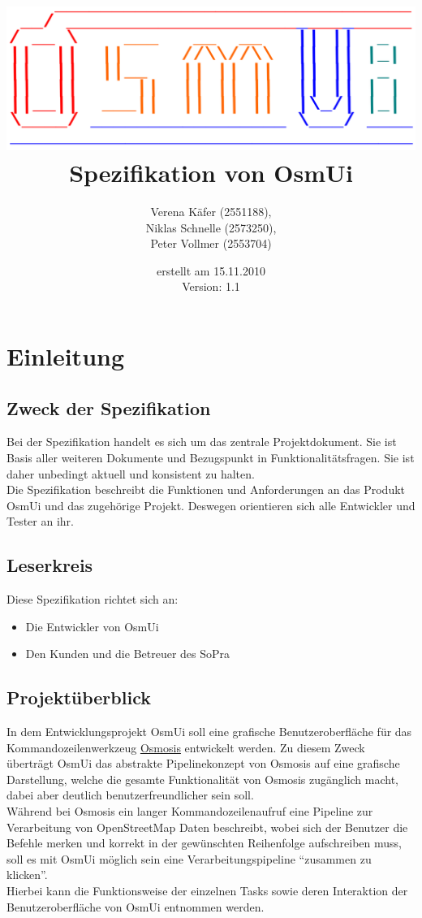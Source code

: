 \documentclass[a4paper,12pt]{scrartcl}
\author{
Verena Käfer (2551188),\\
Niklas Schnelle (2573250),\\
Peter Vollmer (2553704)}
\date{erstellt am 15.11.2010\\
Version: 1.1}
\title{\includegraphics[width=15cm]{../projektplan/Logo_Osmui.png} \\ 
Spezifikation von OsmUi}
\begin{document}
\maketitle
\newpage
\tableofcontents
\newpage

\section{Einleitung}
\subsection{Zweck der Spezifikation}
Bei der Spezifikation handelt es sich um das zentrale Projektdokument. Sie ist Basis aller weiteren Dokumente und
Bezugspunkt in Funktionalitätsfragen. Sie ist daher unbedingt aktuell und konsistent zu halten.\\
Die Spezifikation beschreibt die Funktionen und Anforderungen an das Produkt OsmUi und das zugehörige Projekt. Deswegen orientieren sich alle Entwickler und Tester an ihr.
\subsection{Leserkreis}
Diese Spezifikation richtet sich an:
\begin{itemize}
 \item Die Entwickler von OsmUi
 \item Den Kunden und die Betreuer des SoPra
\end{itemize}

\subsection{Projektüberblick}
In dem Entwicklungsprojekt OsmUi soll eine grafische Benutzeroberfläche für das Kommandozeilenwerkzeug \href{http://wiki.openstreetmap.org/wiki/Osmosis}{Osmosis}
entwickelt werden. Zu diesem Zweck überträgt OsmUi das abstrakte Pipelinekonzept von Osmosis auf eine grafische Darstellung, welche die gesamte Funktionalität von Osmosis zugänglich macht, dabei aber deutlich benutzerfreundlicher sein soll.\\
Während bei Osmosis ein langer Kommandozeilenaufruf eine Pipeline zur Verarbeitung von OpenStreetMap Daten beschreibt, wobei sich der Benutzer die Befehle merken
und korrekt in der gewünschten Reihenfolge aufschreiben muss, soll es mit OsmUi möglich sein eine Verarbeitungspipeline ``zusammen zu klicken''.\\
Hierbei kann die Funktionsweise der einzelnen Tasks sowie deren Interaktion der Benutzeroberfläche von OsmUi entnommen werden.
\end{document}
